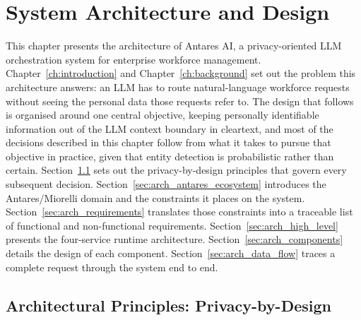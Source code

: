 \chapter{System Architecture and Design}
\label{ch:architecture}

This chapter presents the architecture of Antares AI, a privacy-oriented LLM orchestration system for enterprise workforce management. Chapter~\ref{ch:introduction} and Chapter~\ref{ch:background} set out the problem this architecture answers: an LLM has to route natural-language workforce requests without seeing the personal data those requests refer to. The design that follows is organised around one central objective, keeping personally identifiable information out of the LLM context boundary in cleartext, and most of the decisions described in this chapter follow from what it takes to pursue that objective in practice, given that entity detection is probabilistic rather than certain. Section~\ref{sec:arch_privacy_by_design} sets out the privacy-by-design principles that govern every subsequent decision. Section~\ref{sec:arch_antares_ecosystem} introduces the Antares/Miorelli domain and the constraints it places on the system. Section~\ref{sec:arch_requirements} translates those constraints into a traceable list of functional and non-functional requirements. Section~\ref{sec:arch_high_level} presents the four-service runtime architecture. Section~\ref{sec:arch_components} details the design of each component. Section~\ref{sec:arch_data_flow} traces a complete request through the system end to end.

\section{Architectural Principles: Privacy-by-Design}
\label{sec:arch_privacy_by_design}

